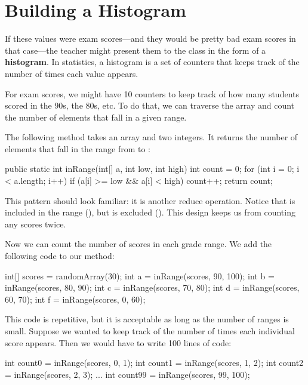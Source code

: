 \section{Building a Histogram}
\label{singlepass}


If these values were exam scores---and they would be pretty bad exam scores in that case---the teacher might present them to the class in the form of a {\bf histogram}.
In statistics, a histogram is a set of counters that keeps track of the number of times each value appears.

For exam scores, we might have 10 counters to keep track of how many students scored in the 90s, the 80s, etc.
To do that, we can traverse the array and count the number of elements that fall in a given range.

The following method takes an array and two integers.
It returns the number of elements that fall in the range from  to :

\begin{code}
public static int inRange(int[] a, int low, int high) {
    int count = 0;
    for (int i = 0; i < a.length; i++) {
        if (a[i] >= low && a[i] < high) {
            count++;
        }
    }
    return count;
}
\end{code}


This pattern should look familiar: it is another reduce operation.
Notice that  is included in the range (\java{>=}), but  is excluded (\java{<}).
This design keeps us from counting any scores twice.

Now we can count the number of scores in each grade range.
We add the following code to our  method:

\begin{code}
int[] scores = randomArray(30);
int a = inRange(scores, 90, 100);
int b = inRange(scores, 80, 90);
int c = inRange(scores, 70, 80);
int d = inRange(scores, 60, 70);
int f = inRange(scores, 0, 60);
\end{code}

This code is repetitive, but it is acceptable as long as the number of ranges is small.
Suppose we wanted to keep track of the number of times each individual score appears.
Then we would have to write 100 lines of code:

\begin{code}
int count0 = inRange(scores, 0, 1);
int count1 = inRange(scores, 1, 2);
int count2 = inRange(scores, 2, 3);
...
int count99 = inRange(scores, 99, 100);
\end{code}

